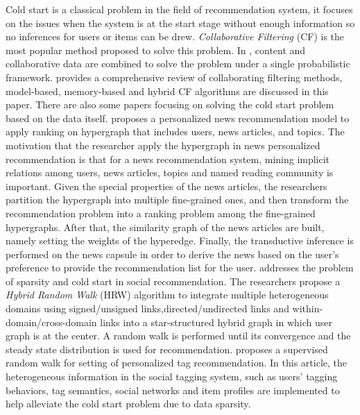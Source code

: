 Cold start is a classical problem in the field of recommendation system, it focuses on the issues when the system is at the start stage without enough information so no inferences for users or items can be drew. \textit{Collaborative Filtering} (CF) is the most popular method proposed to solve this problem. In \cite{schein2002methods}, content and collaborative data are combined to solve the problem under a single probabilistic framework. \cite{su2009survey} provides a comprehensive review of collaborating filtering methods, model-based, memory-based and hybrid CF algorithms are discussed in this paper. There are also some papers focusing on solving the cold start problem based on the data itself. \cite{li2013news} proposes a personalized news recommendation model to apply ranking on hypergraph that includes users, news articles, and topics. The motivation that the researcher apply the hypergraph in news personalized recommendation is that for a news recommendation system, mining implicit relations among users, news articles, topics and named reading community is important. Given the special properties of the news articles, the researchers partition the hypergraph into multiple fine-grained 
ones, and then transform the recommendation problem into a ranking problem among the fine-grained hypergraphs. After that, the similarity graph of the news articles are built, namely setting the weights of the hyperedge. Finally, the transductive inference is performed on the news capsule in order to derive the news based on the user’s preference to provide the recommendation list for the user. \cite{jiang2012social} addresses the problem of sparsity and cold start in social recommendation. The researchers propose a \textit{Hybrid Random Walk} (HRW) algorithm to integrate multiple heterogeneous domains using signed/unsigned links,directed/undirected links and within-domain/cross-domain links into a star-structured hybrid graph in which user graph is at the center. A random walk is performed until its convergence and the steady state distribution is used for recommendation. \cite{feng2012incorporating} proposes a supervised random walk for setting of personalized tag recommendation. In this article, the heterogeneous information in the social tagging system, such as users’ tagging behaviors, tag semantics, social networks and item profiles are implemented to help alleviate the cold start problem due to data sparsity.

